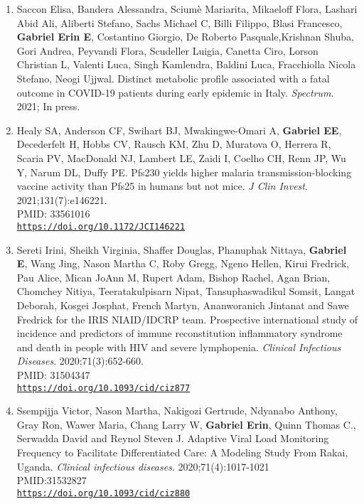 \documentclass[12pt]{article}
\providecommand \url[1]{\href{#1}{#1}}
\renewcommand*\url[1]{\href{#1}{\texttt{#1}}}
\begin{document}
\begin{enumerate}

\item  Saccon Elisa, Bandera Alessandra, Sciumè Mariarita, Mikaeloff Flora, Lashari Abid Ali, Aliberti Stefano,  Sachs Michael C, Billi Filippo, Blasi Francesco, \textbf{Gabriel Erin E}, Costantino Giorgio, De Roberto Pasquale,Krishnan Shuba, Gori Andrea, Peyvandi Flora, Scudeller Luigia, Canetta Ciro, Lorson Christian L, Valenti Luca, Singh Kamlendra, Baldini Luca, Fracchiolla Nicola Stefano, Neogi Ujjwal. Distinct metabolic profile associated with a fatal outcome in COVID-19 patients during early epidemic in Italy. \emph{Spectrum}. 2021; In press.




\item Healy SA, Anderson CF, Swihart BJ, Mwakingwe-Omari A, \textbf{Gabriel EE}, Decederfelt H, Hobbs CV, Rausch KM, Zhu D, Muratova O, Herrera R, Scaria PV, MacDonald NJ, Lambert LE, Zaidi I, Coelho CH, Renn JP, Wu Y, Narum DL, Duffy PE. Pfs230 yields higher malaria transmission-blocking vaccine activity than Pfs25 in humans but not mice. \emph{J Clin Invest}. 2021;131(7):e146221.\\
PMID: 33561016\\
\url{https://doi.org/10.1172/JCI146221}








\item Sereti Irini,  Sheikh Virginia,  Shaffer Douglas, Phanuphak Nittaya, \textbf{Gabriel E}, Wang Jing, Nason  Martha C, Roby Gregg, Ngeno Hellen, Kirui Fredrick, Pau Alice, Mican JoAnn M, Rupert Adam, Bishop Rachel, Agan Brian, Chomchey Nitiya, Teeratakulpisarn Nipat, Tansuphaswadikul Somsit, Langat Deborah,  Kosgei Josphat, French Martyn, Ananworanich Jintanat and Sawe Fredrick for the IRIS NIAID/IDCRP team. Prospective international study of incidence and predictors of immune reconstitution inflammatory syndrome and death in people with HIV and severe lymphopenia.  \emph{Clinical Infectious Diseases}. 2020;71(3):652-660.\\
PMID: 31504347\\
\url{https://doi.org/10.1093/cid/ciz877}\\

\item Ssempijja Victor,  Nason Martha,  Nakigozi Gertrude,  Ndyanabo Anthony,  Gray Ron,  Wawer Maria, Chang Larry W, \textbf{Gabriel Erin}, Quinn Thomas C.,  Serwadda David and Reynol Steven J. Adaptive Viral Load Monitoring Frequency to Facilitate Differentiated Care: A Modeling Study From Rakai, Uganda. \emph{Clinical infectious diseases}. 2020;71(4):1017-1021\\
PMID:31532827\\
\url{https://doi.org/10.1093/cid/ciz880}\\





\end{enumerate}
\end{document}
